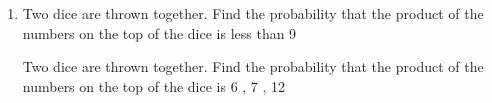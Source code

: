 \begin{enumerate}[label=\thechapter.\arabic*,ref=\thechapter.\theenumi]
\solution
\\

\item
Two dice are thrown together. Find the probability that the product of the numbers on the top of the dice is less than 9\\
\solution

Two dice are thrown together. Find the probability that the product of the numbers on the top of the dice is 6 , 7 , 12 \\
\solution

\end{enumerate}
 
